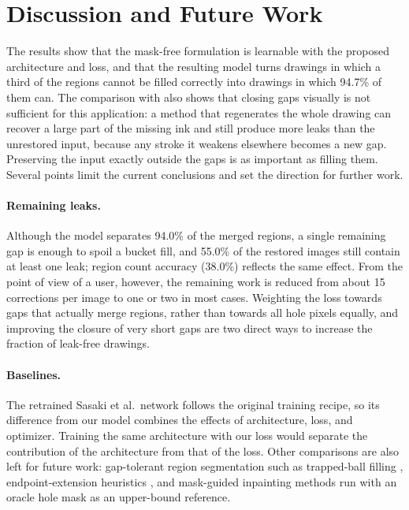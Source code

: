 \documentclass[preprint,12pt]{elsarticle}
\begin{document}
\section{Discussion and Future Work}
\label{sec:discussion}

The results show that the mask-free formulation is learnable with the proposed
architecture and loss, and that the resulting model turns drawings in which a third
of the regions cannot be filled correctly into drawings in which 94.7\% of them can.
The comparison with \citet{sasaki2017joint} also shows that closing gaps visually is
not sufficient for this application: a method that regenerates the whole drawing can
recover a large part of the missing ink and still produce more leaks than the
unrestored input, because any stroke it weakens elsewhere becomes a new gap.
Preserving the input exactly outside the gaps is as important as filling them.
Several points limit the current conclusions and set the direction for further work.

\paragraph{Remaining leaks.} Although the model separates 94.0\% of the merged
regions, a single remaining gap is enough to spoil a bucket fill, and 55.0\% of the
restored images still contain at least one leak; region count accuracy (38.0\%)
reflects the same effect. From the point of view of a user, however, the remaining
work is reduced from about 15 corrections per image to one or two in most cases.
Weighting the loss towards gaps that actually merge regions, rather than towards all
hole pixels equally, and improving the closure of very short gaps are two direct ways
to increase the fraction of leak-free drawings.

\paragraph{Baselines.} The retrained Sasaki et al.\ network follows the
original training recipe, so its difference from our model combines the effects of
architecture, loss, and optimizer. Training the same architecture with our loss would
separate the contribution of the architecture from that of the loss.
Other comparisons are also left for future work: gap-tolerant region segmentation
such as trapped-ball filling \citep{zhang2009vectorizing}, endpoint-extension heuristics \citep{fourey2018flat}, and mask-guided inpainting methods run with an oracle hole mask as an
upper-bound reference.
\end{document}
